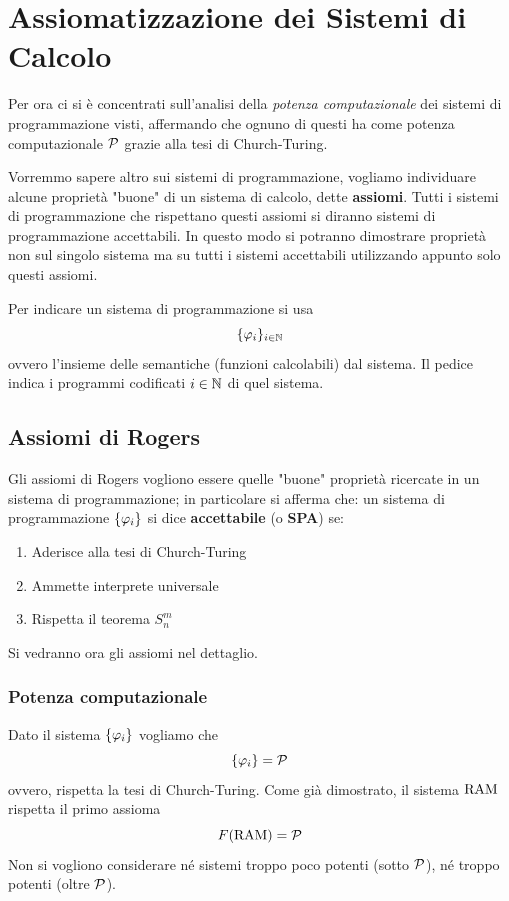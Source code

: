 \section{Assiomatizzazione dei Sistemi di Calcolo}

Per ora ci si è concentrati sull'analisi della \textit{potenza computazionale} dei sistemi di programmazione visti, affermando che ognuno di questi ha come potenza computazionale $\mathcal{P}$ grazie alla tesi di Church-Turing.

Vorremmo sapere altro sui sistemi di programmazione, vogliamo individuare alcune proprietà "buone" di un sistema di calcolo, dette \textbf{assiomi}. Tutti i sistemi di programmazione che rispettano questi assiomi si diranno sistemi di programmazione accettabili. In questo modo si potranno dimostrare proprietà non sul singolo sistema ma su tutti i sistemi accettabili utilizzando appunto solo questi assiomi.

Per indicare un sistema di programmazione si usa
$$ \{\varphi_i\}_{i \in \mathbb{N}}$$
ovvero l'insieme delle semantiche (funzioni calcolabili) dal sistema. Il pedice indica i programmi codificati $i \in \mathbb{N}$ di quel sistema.

\subsection{Assiomi di Rogers}

Gli assiomi di Rogers vogliono essere quelle "buone" proprietà ricercate in un sistema di programmazione; in particolare si afferma che: un sistema di programmazione $\{\varphi_i\}$ si dice \textbf{accettabile} (o \textbf{SPA}) se: \\
\begin{enumerate}
	\item Aderisce alla tesi di Church-Turing
	\item Ammette interprete universale
	\item Rispetta il teorema $S_n^m$
\end{enumerate}
Si vedranno ora gli assiomi nel dettaglio.

\subsubsection{Potenza computazionale}
Dato il sistema $\{\varphi_i\}$ vogliamo che
$$ \{\varphi_i\} = \mathcal{P} $$
ovvero, rispetta la tesi di Church-Turing. Come già dimostrato, il sistema $\text{RAM}$ rispetta il primo assioma
$$ F(\text{RAM}) = \mathcal{P} $$
Non si vogliono considerare né sistemi troppo poco potenti (sotto $\mathcal{P}$), né troppo potenti (oltre $\mathcal{P}$).

